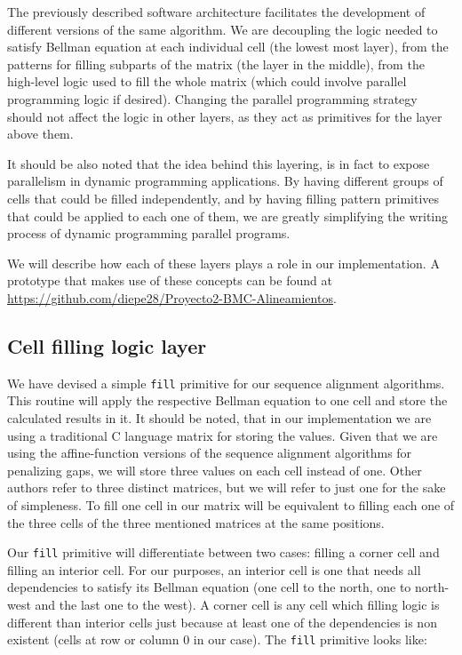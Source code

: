 \documentclass[journal]{IEEEtran}
\begin{document}
The previously described software architecture facilitates the development of different versions of the same algorithm. We are decoupling the logic needed to satisfy Bellman equation at each individual cell (the lowest most layer), from the patterns for filling subparts of the matrix (the layer in the middle), from the high-level logic used to fill the whole matrix (which could involve parallel programming logic if desired). Changing the parallel programming strategy should not affect the logic in other layers, as they act as primitives for the layer above them.

It should be also noted that the idea behind this layering, is in fact to expose parallelism in dynamic programming applications. By having different groups of cells that could be filled independently, and by having filling pattern primitives that could be applied to each one of them, we are greatly simplifying the writing process of dynamic programming parallel programs.

We will describe how each of these layers plays a role in our implementation. A prototype that makes use of these concepts can be found at \url{https://github.com/diepe28/Proyecto2-BMC-Alineamientos}.

\subsection{Cell filling logic layer}

We have devised a simple {\tt fill} primitive for our sequence alignment algorithms. This routine will apply the respective Bellman equation to one cell and store the calculated results in it. It should be noted, that in our implementation we are using a traditional C language matrix for storing the values. Given that we are using the affine-function versions of the sequence alignment algorithms for penalizing gaps, we will store three values on each cell instead of one. Other authors refer to three distinct matrices, but we will refer to just one for the sake of simpleness. To fill one cell in our matrix will be equivalent to filling each one of the three cells of the three mentioned matrices at the same positions.

Our {\tt fill} primitive will differentiate between two cases: filling a corner cell and filling an interior cell. For our purposes, an interior cell is one that needs all dependencies to satisfy its Bellman equation (one cell to the north, one to north-west and the last one to the west). A corner cell is any cell which filling logic is different than interior cells just because at least one of the dependencies is non existent (cells at row or column $0$ in our case). The  {\tt fill} primitive looks like:
\end{document}
